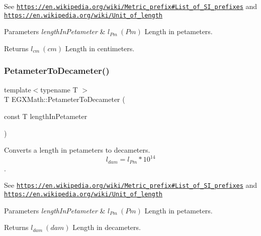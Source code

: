 See \href{https://en.wikipedia.org/wiki/Metric_prefix#List_of_SI_prefixes}{\tt https\+://en.\+wikipedia.\+org/wiki/\+Metric\+\_\+prefix\#\+List\+\_\+of\+\_\+\+S\+I\+\_\+prefixes} and \href{https://en.wikipedia.org/wiki/Unit_of_length}{\tt https\+://en.\+wikipedia.\+org/wiki/\+Unit\+\_\+of\+\_\+length} 
\begin{DoxyParams}{Parameters}
{\em length\+In\+Petameter} & $ l_{Pm}\ (Pm)$ Length in petameters. \\
\hline
\end{DoxyParams}
\begin{DoxyReturn}{Returns}
$ l_{cm}\ (cm)$ Length in centimeters. 
\end{DoxyReturn}
\mbox{\label{group___e_g_x_math-_conversions-_length_conversions-_petameter-_s_i_gaf0fe67e33a48584d1f9f0ffa1ca4c8f9}} 
\subsubsection{\texorpdfstring{Petameter\+To\+Decameter()}{PetameterToDecameter()}}
{\footnotesize\ttfamily template$<$typename T $>$ \\
T E\+G\+X\+Math\+::\+Petameter\+To\+Decameter (\begin{DoxyParamCaption}\item[{const T}]{length\+In\+Petameter }\end{DoxyParamCaption})}



Converts a length in petameters to decameters. \[ l_{dam}=l_{Pm} * 10^{14} \]. 

See \href{https://en.wikipedia.org/wiki/Metric_prefix#List_of_SI_prefixes}{\tt https\+://en.\+wikipedia.\+org/wiki/\+Metric\+\_\+prefix\#\+List\+\_\+of\+\_\+\+S\+I\+\_\+prefixes} and \href{https://en.wikipedia.org/wiki/Unit_of_length}{\tt https\+://en.\+wikipedia.\+org/wiki/\+Unit\+\_\+of\+\_\+length} 
\begin{DoxyParams}{Parameters}
{\em length\+In\+Petameter} & $ l_{Pm}\ (Pm)$ Length in petameters. \\
\hline
\end{DoxyParams}
\begin{DoxyReturn}{Returns}
$ l_{dam}\ (dam)$ Length in decameters. 
\end{DoxyReturn}
\mbox{\label{group___e_g_x_math-_conversions-_length_conversions-_petameter-_s_i_ga1e0359fb350c64cd3e1fc9293376de96}} 
